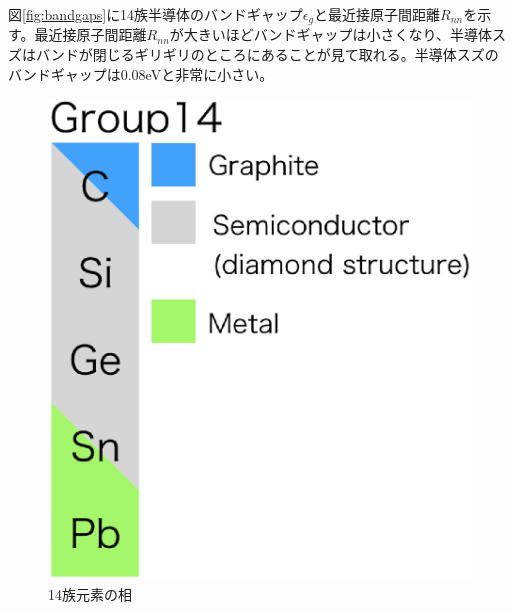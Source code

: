 図\ref{fig:bandgaps}に14族半導体のバンドギャップ$\epsilon_g$と最近接原子間距離$R_{nn}$を示す\cite{Yonezawa}。最近接原子間距離$R_{nn}$が大きいほどバンドギャップは小さくなり、半導体スズはバンドが閉じるギリギリのところにあることが見て取れる。半導体スズのバンドギャップは0.08eVと非常に小さい。
\begin{figure}[!h]
 \begin{minipage}{0.4\hsize}
  \begin{center}
   \includegraphics[width=\hsize]{Introduction/group14.eps}
  \end{center}
  \caption{14族元素の相}
  \label{fig:group14}
 \end{minipage}
 \begin{minipage}{0.6\hsize}
  \begin{center}

\end{center}
\end{minipage}
\end{figure}
